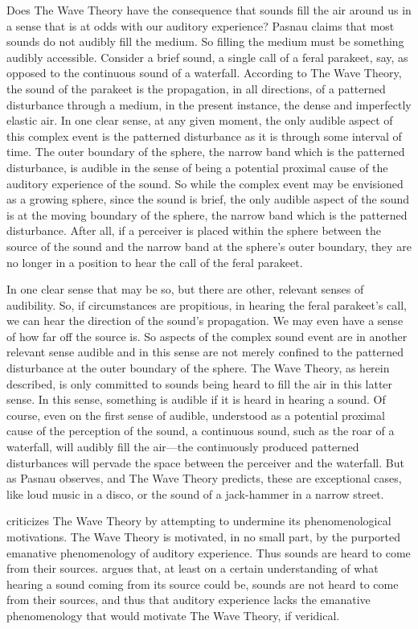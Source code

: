 Does The Wave Theory have the consequence that sounds fill the air around us in a sense that is at odds with our auditory experience? Pasnau claims that most sounds do not audibly fill the medium. So filling the medium must be something audibly accessible. Consider a brief sound, a single call of a feral parakeet, say, as opposed to the continuous sound of a waterfall. According to The Wave Theory, the sound of the parakeet is the propagation, in all directions, of a patterned disturbance through a medium, in the present instance, the dense and imperfectly elastic air. In one clear sense, at any given moment, the only audible aspect of this complex event is the patterned disturbance as it is through some interval of time. The outer boundary of the sphere, the narrow band which is the patterned disturbance, is audible in the sense of being a potential proximal cause of the auditory experience of the sound. So while the complex event may be envisioned as a growing sphere, since the sound is brief, the only audible aspect of the sound is at the moving boundary of the sphere, the narrow band which is the patterned disturbance. After all, if a perceiver is placed within the sphere between the source of the sound and the narrow band at the sphere's outer boundary, they are no longer in a position to hear the call of the feral parakeet. 

In one clear sense that may be so, but there are other, relevant senses of audibility. So, if circumstances are propitious, in hearing the feral parakeet's call, we can hear the direction of the sound's propagation. We may even have a sense of how far off the source is. So aspects of the complex sound event are in another relevant sense audible and in this sense are not merely confined to the patterned disturbance at the outer boundary of the sphere. The Wave Theory, as herein described, is only committed to sounds being heard to fill the air in this latter sense. In this sense, something is audible if it is heard in hearing a sound. Of course, even on the first sense of audible, understood as a potential proximal cause of the perception of the sound, a continuous sound, such as the roar of a waterfall, will audibly fill the air---the continuously produced patterned disturbances will pervade the space between the perceiver and the waterfall. But as Pasnau observes, and The Wave Theory predicts, these are exceptional cases, like loud music in a disco, or the sound of a jack-hammer in a narrow street.

\citet[chapter 3.4]{OCallaghan:2007xy} criticizes The Wave Theory by attempting to undermine its phenomenological motivations. The Wave Theory is motivated, in no small part, by the purported emanative phenomenology of auditory experience. Thus sounds are heard to come from their sources. \citet{OCallaghan:2007xy,OCallaghan:2009aa} argues that, at least on a certain understanding of what hearing a sound coming from its source could be, sounds are not heard to come from their sources, and thus that auditory experience lacks the emanative phenomenology that would motivate The Wave Theory, if veridical.

